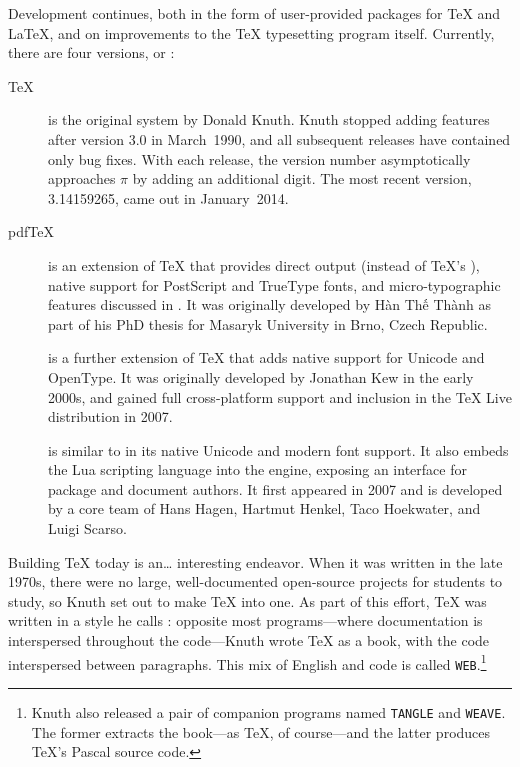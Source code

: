 Development continues,
both in the form of user-provided packages for \TeX{} and \LaTeX{},
and on improvements to the \TeX{} typesetting program itself.
Currently, there are four versions, or :
\begin{description}
\item[\TeX] is the original system by Donald Knuth.
Knuth stopped adding features after version 3.0 in March~1990,
and all subsequent releases have contained only bug fixes.
With each release, the version number asymptotically approaches $\pi$
by adding an additional digit.
The most recent version, 3.14159265, came out in January~2014.

\item[pdf\TeX] is an extension of \TeX{} that provides direct 
    output (instead of \TeX's ),
    native support for PostScript
    and TrueType fonts,
    and micro-typographic features discussed in .
    It was originally developed by
    Hàn Thế Thành
    as part of his PhD thesis
    for Masaryk University in Brno, Czech Republic.\punckern{}

\item[\XeTeX] is a further extension of \TeX{} that adds native support for
    Unicode and OpenType.
    It was originally developed by Jonathan Kew in the early 2000s,
    and gained full cross-platform support and inclusion in the \TeX{} Live
    distribution in 2007.\punckern{}

\item[\LuaTeX] is similar to \XeTeX{} in its native Unicode and modern font support.
    It also embeds the Lua scripting language into the engine,
    exposing an interface for package and document authors.
    It first appeared in 2007 and is developed by a core team of
    Hans Hagen, Hartmut Henkel, Taco Hoekwater,
    and Luigi Scarso.\punckern{}
\end{description}

Building \TeX{} today is an\dots{} interesting endeavor.
When it was written in the late 1970s,
there were no large, well-documented open-source projects for students to study,
so Knuth set out to make \TeX{} into one.
As part of this effort, \TeX{} was written in a style he calls
: opposite most programs---where
documentation is interspersed throughout the code---Knuth wrote \TeX{} as a book,
with the code interspersed between paragraphs.
This mix of English and code is called \texttt{WEB}.\punckern\footnote{Knuth
also released a pair of companion programs named
\texttt{TANGLE} and \texttt{WEAVE}.
The former extracts the book---as \TeX, of course---and the latter
produces \TeX's Pascal source code.}

